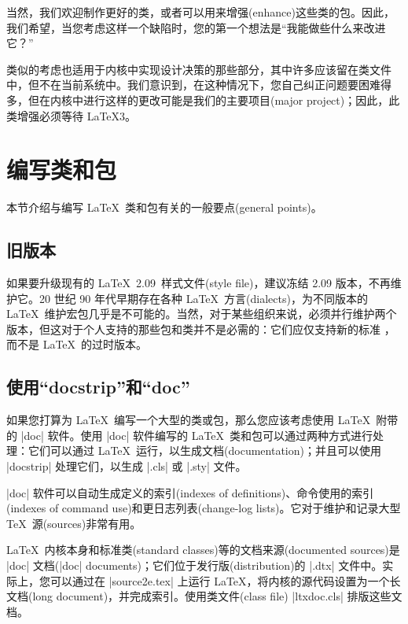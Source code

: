 \documentclass{ltxguide}[1995/11/28]
\newcommand{\heiti}{\CJKfamily{heiti}} %
\begin{document}
当然，我们欢迎制作更好的类，或者可以用来增强(enhance)这些类的包。因此，我们希望，当您考虑这样一个缺陷时，您的第一个想法是“我能做些什么来改进它？”

类似的考虑也适用于内核中实现设计决策的那些部分，其中许多应该留在类文件中，但不在当前系统中。我们意识到，在这种情况下，您自己纠正问题要困难得多，但在内核中进行这样的更改可能是我们的主要项目(major project)；因此，此类增强必须等待 \LaTeX3。

\newpage


\section{\heiti 编写类和包}
\label{Sec:writing}

本节介绍与编写 \LaTeX{}\ 类和包有关的一般要点(general points)。


\subsection[旧版本]{\heiti 旧版本}

如果要升级现有的 \LaTeX~2.09\ 样式文件(style file)，建议冻结 2.09 版本，不再维护它。20 世纪 90 年代早期存在各种 \LaTeX{}\ 方言(dialects)，为不同版本的 \LaTeX{}\ 维护宏包几乎是不可能的。当然，对于某些组织来说，必须并行维护两个版本，但这对于个人支持的那些包和类并不是必需的：它们应仅支持新的标准 \LaTeXe{}，而不是 \LaTeX{}\ 的过时版本。


\subsection[使用“docstrip”和“doc”]{\heiti 使用“docstrip”和“doc”}

如果您打算为 \LaTeX{}\ 编写一个大型的类或包，那么您应该考虑使用 \LaTeX{}\ 附带的 |doc| 软件。使用 |doc| 软件编写的 \LaTeX{}\ 类和包可以通过两种方式进行处理：它们可以通过 \LaTeX{}\ 运行，以生成文档(documentation)；并且可以使用 |docstrip| 处理它们，以生成 |.cls| 或 |.sty| 文件。

|doc| 软件可以自动生成定义的索引(indexes of definitions)、命令使用的索引(indexes of command use)和更日志列表(change-log lists)。它对于维护和记录大型 \TeX{}\ 源(sources)非常有用。

\LaTeX{}\ 内核本身和标准类(standard classes)等的文档来源(documented sources)是 |doc| 文档(|doc| documents)；它们位于发行版(distribution)的 |.dtx| 文件中。实际上，您可以通过在 |source2e.tex| 上运行 \LaTeX{}，将内核的源代码设置为一个长文档(long document)，并完成索引。使用类文件(class file) |ltxdoc.cls| 排版这些文档。
\end{document}
